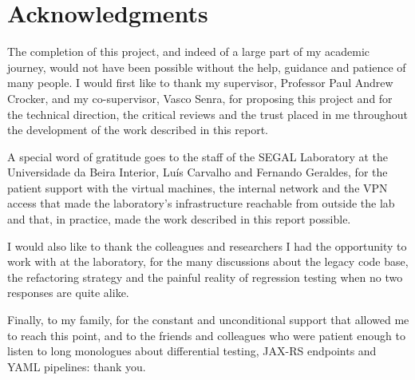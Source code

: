 \chapter*{Acknowledgments}
\label{chap:ack}
\thispagestyle{empty}

The completion of this project, and indeed of a large part of my academic journey,
would not have been possible without the help, guidance and patience of many
people. I would first like to thank my supervisor, Professor Paul Andrew Crocker,
and my co-supervisor, Vasco Senra, for proposing this project and for the
technical direction, the critical reviews and the trust placed in me throughout
the development of the work described in this report.

A special word of gratitude goes to the staff of the SEGAL Laboratory at the
Universidade da Beira Interior, Luís Carvalho and Fernando Geraldes, for the
patient support with the virtual machines, the internal network and the VPN
access that made the laboratory's infrastructure reachable from outside the
lab and that, in practice, made the work described in this report possible.

I would also like to thank the colleagues and researchers I had the
opportunity to work with at the laboratory, for the many discussions about the
legacy code base, the refactoring strategy and the painful reality of
regression testing when no two responses are quite alike.

Finally, to my family, for the constant and unconditional support that
allowed me to reach this point, and to the friends and colleagues who were patient
enough to listen to long monologues about differential testing, JAX-RS
endpoints and YAML pipelines: thank you.